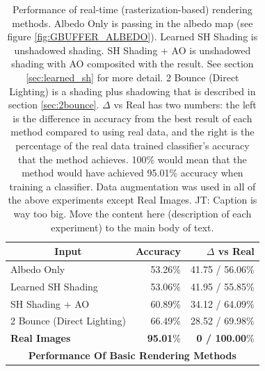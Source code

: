 \documentclass[10pt,twocolumn,letterpaper]{article}
\newcommand{\tompson}[1]{{\color{green} JT: #1}}
\begin{document}
\begin{table}[]
\centering
\begin{tabular}{|l|r|r|}
\hline
\multicolumn{1}{|c|}{\textbf{Input}}
& \multicolumn{1}{r|}{\textbf{Accuracy}}
& \multicolumn{1}{r|}{\textbf{$\Delta$ vs Real}} \\ \hline
Albedo Only 				&53.26\%	& 41.75 / 56.06\%	\\
Learned SH Shading			&53.06\%	& 41.95 / 55.85\%	\\
SH Shading + AO				&60.89\%    & 34.12 / 64.09\%   \\
2 Bounce (Direct Lighting)	&66.49\%	& 28.52 / 69.98\%   \\
\textbf{Real Images}		& \textbf{95.01}\%	& \textbf{0 / 100.00}\%	\\ \hline
\multicolumn{3}{|c|}{\textbf{Performance Of Basic Rendering Methods}}	\\ \hline
\end{tabular}

\caption{Performance of real-time (rasterization-based) rendering methods. Albedo Only is passing in the albedo map (see figure \ref{fig:GBUFFER_ALBEDO}). Learned SH Shading is unshadowed shading. SH Shading + AO is unshadowed shading with AO composited with the result. See section \ref{sec:learned_sh} for more detail. 2 Bounce (Direct Lighting) is a shading plus shadowing that is described in section \ref{sec:2bounce}. $\Delta$ vs Real has two numbers: the left is the difference in accuracy from the best result of each method compared to using real data, and the right is the percentage of the real data trained classifier's accuracy that the method achieves.  100\% would mean that the method would have achieved 95.01\% accuracy when training a classifier. Data augmentation was used in all of the above experiments except Real Images. \tompson{Caption is way too big. Move the content here (description of each experiment) to the main body of text.}} 
\label{table:tblnonGI}
\end{table}
\end{document}

